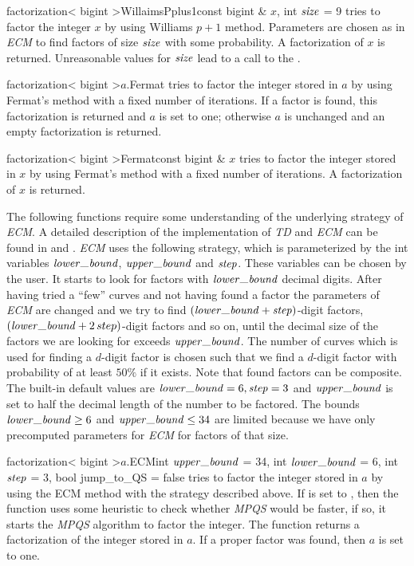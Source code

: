 \begin{fcode}{factorization< bigint >}{WillaimsPplus1}{const bigint & $x$, int $\mathit{size}$ = 9}
  tries to factor the integer $x$ by using Williams $p+1$ method.  Parameters are chosen as in
  \emph{ECM} to find factors of size $\mathit{size}$ with some probability.  A factorization of $x$
  is returned.  Unreasonable values for $\mathit{size}$ lead to a call to the \LEH.
\end{fcode}

\begin{fcode}{factorization< bigint >}{$a$.Fermat}{}
  tries to factor the integer stored in $a$ by using Fermat's method with a fixed number of
  iterations.  If a factor is found, this factorization is returned and $a$ is set to one;
  otherwise $a$ is unchanged and an empty factorization is returned.
\end{fcode}

\begin{fcode}{factorization< bigint >}{Fermat}{const bigint & $x$}
  tries to factor the integer stored in $x$ by using Fermat's method with a fixed number of
  iterations.  A factorization of $x$ is returned.
\end{fcode}

The following functions require some understanding of the underlying strategy of \emph{ECM}.  A
detailed description of the implementation of \emph{TD} and \emph{ECM} can be found in
\cite{Berger_Thesis:1993} and \cite{Mueller_Thesis:1995}.  \emph{ECM} uses the following
strategy, which is parameterized by the int variables $\lowerbound$, $\upperbound$ and $\mathit{step}$.
These variables can be chosen by the user.  It starts to look for factors with $\lowerbound$
decimal digits.  After having tried a ``few'' curves and not having found a factor the
parameters of \emph{ECM} are changed and we try to find $(\lowerbound + \step)$-digit factors,
$(\lowerbound + 2\,step)$-digit factors and so on, until the decimal size of the factors we are
looking for exceeds $\upperbound$.  The number of curves which is used for finding a $d$-digit
factor is chosen such that we find a $d$-digit factor with probability of at least $50 \%$ if it
exists.  Note that found factors can be composite.  The built-in default values are $\lowerbound
= 6, \step = 3$ and $\upperbound$ is set to half the decimal length of the number to be factored.
The bounds $\lowerbound \geq 6$ and $\upperbound \leq 34$ are limited because we have only
precomputed parameters for \emph{ECM} for factors of that size.

\begin{fcode}{factorization< bigint >}{$a$.ECM}{int $\upperbound$ = 34,
    int $\lowerbound$ = 6, int $\mathit{step}$ = 3, bool jump_to_QS = false}%
  tries to factor the integer stored in $a$ by using the ECM method with the strategy described
  above.  If  is set to \TRUE, then the function uses some heuristic to check
  whether \emph{MPQS} would be faster, if so, it starts the \emph{MPQS} algorithm to factor the
  integer.  The function returns a factorization of the integer stored in $a$.  If a proper
  factor was found, then $a$ is set to one.
\end{fcode}

